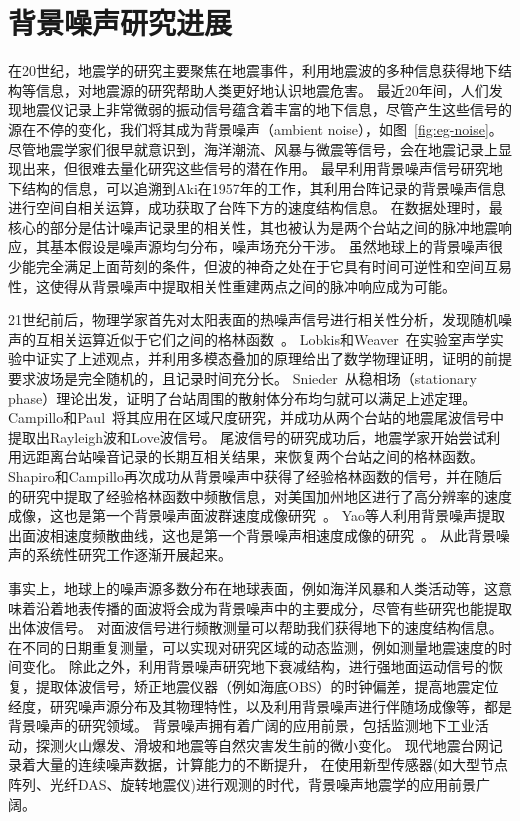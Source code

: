 \section{背景噪声研究进展}

在20世纪，地震学的研究主要聚焦在地震事件，利用地震波的多种信息获得地下结构等信息，对地震源的研究帮助人类更好地认识地震危害。
最近20年间，人们发现地震仪记录上非常微弱的振动信号蕴含着丰富的地下信息，尽管产生这些信号的源在不停的变化，我们将其成为背景噪声（ambient noise），如图~\ref{fig:eg-noise}。
尽管地震学家们很早就意识到，海洋潮流、风暴与微震等信号，会在地震记录上显现出来，但很难去量化研究这些信号的潜在作用。
最早利用背景噪声信号研究地下结构的信息，可以追溯到Aki在1957年的工作\citep{aki1957space}，其利用台阵记录的背景噪声信息进行空间自相关运算，成功获取了台阵下方的速度结构信息。
在数据处理时，最核心的部分是估计噪声记录里的相关性，其也被认为是两个台站之间的脉冲地震响应，其基本假设是噪声源均匀分布，噪声场充分干涉。
虽然地球上的背景噪声很少能完全满足上面苛刻的条件，但波的神奇之处在于它具有时间可逆性和空间互易性，这使得从背景噪声中提取相关性重建两点之间的脉冲响应成为可能。

21世纪前后，物理学家首先对太阳表面的热噪声信号进行相关性分析，发现随机噪声的互相关运算近似于它们之间的格林函数~\citep{woodard1997implications}。
Lobkis和Weaver~\citep{weaver2001ultrasonics}在实验室声学实验中证实了上述观点，并利用多模态叠加的原理给出了数学物理证明，证明的前提要求波场是完全随机的，且记录时间充分长。
Snieder~\citep{snieder2004extracting}从稳相场（stationary phase）理论出发，证明了台站周围的散射体分布均匀就可以满足上述定理。
Campillo和Paul~\citep{campillo2003long}将其应用在区域尺度研究，并成功从两个台站的地震尾波信号中提取出Rayleigh波和Love波信号。
尾波信号的研究成功后，地震学家开始尝试利用远距离台站噪音记录的长期互相关结果，来恢复两个台站之间的格林函数。
Shapiro和Campillo再次成功从背景噪声中获得了经验格林函数的信号，并在随后的研究中提取了经验格林函数中频散信息，对美国加州地区进行了高分辨率的速度成像，这也是第一个背景噪声面波群速度成像研究~\citep{shapiro2005high}。
Yao等人利用背景噪声提取出面波相速度频散曲线，这也是第一个背景噪声相速度成像的研究~\citep{yao2006surface}。
从此背景噪声的系统性研究工作逐渐开展起来。

事实上，地球上的噪声源多数分布在地球表面，例如海洋风暴和人类活动等，这意味着沿着地表传播的面波将会成为背景噪声中的主要成分，尽管有些研究也能提取出体波信号。
对面波信号进行频散测量可以帮助我们获得地下的速度结构信息。
在不同的日期重复测量，可以实现对研究区域的动态监测，例如测量地震速度的时间变化。
除此之外，利用背景噪声研究地下衰减结构，进行强地面运动信号的恢复，提取体波信号，矫正地震仪器（例如海底OBS）的时钟偏差，提高地震定位经度，研究噪声源分布及其物理特性，以及利用背景噪声进行伴随场成像等，都是背景噪声的研究领域。
背景噪声拥有着广阔的应用前景，包括监测地下工业活动，探测火山爆发、滑坡和地震等自然灾害发生前的微小变化。
现代地震台网记录着大量的连续噪声数据，计算能力的不断提升，
在使用新型传感器(如大型节点阵列、光纤DAS、旋转地震仪)进行观测的时代，背景噪声地震学的应用前景广阔。


